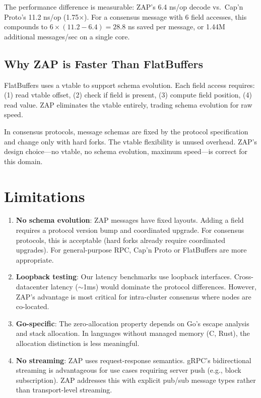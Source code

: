 \documentclass[11pt,letterpaper]{article}
\begin{document}
The performance difference is measurable: ZAP's 6.4 ns/op decode vs.\ Cap'n Proto's 11.2 ns/op (1.75$\times$). For a consensus message with 6 field accesses, this compounds to $6 \times (11.2 - 6.4) = 28.8$ ns saved per message, or 1.44M additional messages/sec on a single core.

\subsection{Why ZAP is Faster Than FlatBuffers}

FlatBuffers uses a vtable to support schema evolution. Each field access requires: (1) read vtable offset, (2) check if field is present, (3) compute field position, (4) read value. ZAP eliminates the vtable entirely, trading schema evolution for raw speed.

In consensus protocols, message schemas are fixed by the protocol specification and change only with hard forks. The vtable flexibility is unused overhead. ZAP's design choice---no vtable, no schema evolution, maximum speed---is correct for this domain.

\section{Limitations}

\begin{enumerate}
\item \textbf{No schema evolution}: ZAP messages have fixed layouts. Adding a field requires a protocol version bump and coordinated upgrade. For consensus protocols, this is acceptable (hard forks already require coordinated upgrades). For general-purpose RPC, Cap'n Proto or FlatBuffers are more appropriate.

\item \textbf{Loopback testing}: Our latency benchmarks use loopback interfaces. Cross-datacenter latency ($\sim$1ms) would dominate the protocol differences. However, ZAP's advantage is most critical for intra-cluster consensus where nodes are co-located.

\item \textbf{Go-specific}: The zero-allocation property depends on Go's escape analysis and stack allocation. In languages without managed memory (C, Rust), the allocation distinction is less meaningful.

\item \textbf{No streaming}: ZAP uses request-response semantics. gRPC's bidirectional streaming is advantageous for use cases requiring server push (e.g., block subscription). ZAP addresses this with explicit pub/sub message types rather than transport-level streaming.
\end{enumerate}
\end{document}
